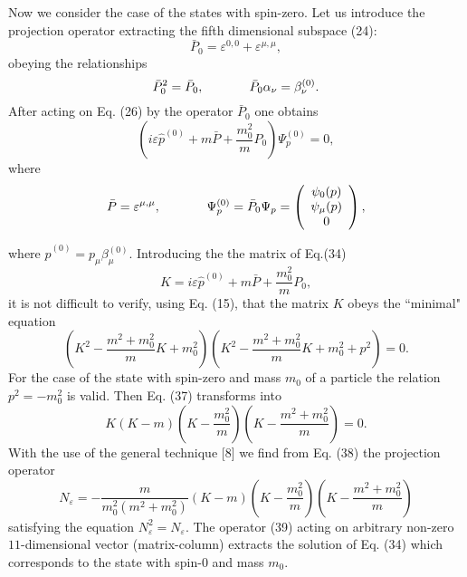 \documentclass[a4paper,12pt]{article}
\begin{document}
Now we consider the case of the states with spin-zero. Let us
introduce the projection operator extracting the fifth dimensional
subspace (24):
\begin{equation}
\bar{P}_0= \varepsilon^{0,0}+\varepsilon^{\mu,\mu},\label{32}
\end{equation}
obeying the relationships
\begin{equation}
\bar{P}_0^2=
\bar{P}_0,\hspace{0.5in}\bar{P}_0\alpha_\nu=\beta_\nu^{(0)}.
\label{33}
\end{equation}
After acting on Eq. (26) by the operator $\bar{P}_0$ one obtains
\begin{equation}
\left(i\varepsilon \widehat{p}^{(0)}+
m\bar{P}+\frac{m_0^2}{m}P_0\right)\Psi^{(0)}_p=0, \label{34}
\end{equation}
where
\begin{equation}
\bar{P}=\varepsilon^{\mu,\mu},\hspace{0.5in}
\Psi^{(0)}_p=\bar{P}_0\Psi_p=\left(
\begin{array}{c}
\psi_0 (p)\\
\psi_\mu (p)\\
0
\end{array}
\right), \label{35}
\end{equation}

where $\widehat{p}^{(0)}=p_\mu \beta_\mu^{(0)}$. Introducing the
the matrix of Eq.(34)
\begin{equation}
K=i\varepsilon \widehat{p}^{(0)}+ m\bar{P}+\frac{m_0^2}{m}P_0,
\label{36}
\end{equation}
it is not difficult to verify, using Eq. (15), that the matrix $K$
obeys the ``minimal" equation
\begin{equation}
\left(K^2-\frac{m^2+m_0^2}{m}K+m_0^2\right)
\left(K^2-\frac{m^2+m_0^2}{m}K+m_0^2+p^2\right)=0. \label{37}
\end{equation}
For the case of the state with spin-zero and mass $m_0$ of a
particle the relation $p^2=-m_0^2$ is valid. Then Eq. (37)
transforms into
\begin{equation}
K\left(K-m\right)\left(K-\frac{m_0^2}{m}\right)
\left(K-\frac{m^2+m_0^2}{m}\right)=0. \label{38}
\end{equation}
With the use of the general technique [8] we find from Eq. (38)
the projection operator
\begin{equation}
N_{\varepsilon}
=-\frac{m}{m_0^2\left(m^2+m_0^2\right)}\left(K-m\right)
\left(K-\frac{m_0^2}{m}\right) \left(K-\frac{m^2+m_0^2}{m}\right)
\label{39}
\end{equation}
satisfying the equation $N_{\varepsilon}^2=N_{\varepsilon}$. The
operator (39) acting on arbitrary non-zero $11$-dimensional vector
(matrix-column) extracts the solution of Eq. (34) which
corresponds to the state with spin-$0$ and mass $m_0$.
\end{document}
